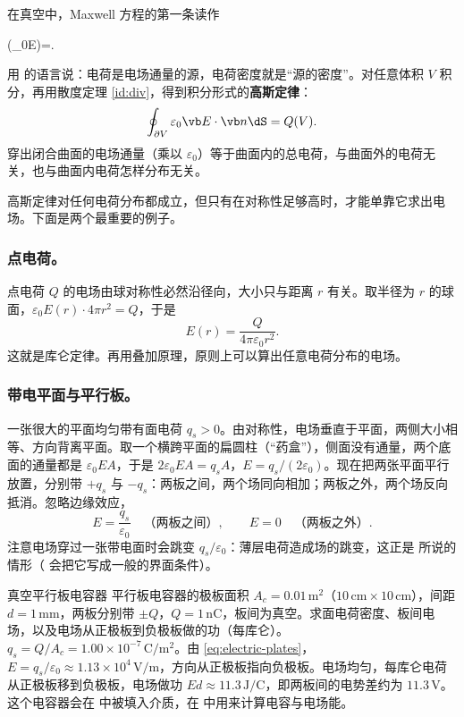 在真空中，Maxwell 方程的第一条读作
\begin{keyeq}
\nabla\cdot(\varepsilon_0\vb E)=\rho .
\label{eq:gaussvac}
\end{keyeq}
用 的语言说：电荷是电场通量的源，电荷密度就是“源的密度”。对任意体积 $V$ 积分，再用散度定理 \eqref{id:div}，得到积分形式的\textbf{高斯定律}：
\begin{equation}
\oint_{\partial V}\varepsilon_0\vb E\cdot\vb n\dS=Q(V).
\label{eq:electric-gaussint}
\end{equation}
穿出闭合曲面的电场通量（乘以 $\varepsilon_0$）等于曲面内的总电荷，与曲面外的电荷无关，也与曲面内电荷怎样分布无关。

高斯定律对任何电荷分布都成立，但只有在对称性足够高时，才能单靠它求出电场。下面是两个最重要的例子。

\subsubsection{点电荷。}
点电荷 $Q$ 的电场由球对称性必然沿径向，大小只与距离 $r$ 有关。取半径为 $r$ 的球面，$\varepsilon_0E(r)\cdot4\pi r^2=Q$，于是
\begin{equation}
E(r)=\frac{Q}{4\pi\varepsilon_0r^2}.
\label{eq:electric-coulomb}
\end{equation}
这就是库仑定律。再用叠加原理，原则上可以算出任意电荷分布的电场。

\subsubsection{带电平面与平行板。}
一张很大的平面均匀带有面电荷 $q_s>0$。由对称性，电场垂直于平面，两侧大小相等、方向背离平面。取一个横跨平面的扁圆柱（“药盒”），侧面没有通量，两个底面的通量都是 $\varepsilon_0EA$，于是 $2\varepsilon_0EA=q_sA$，$E=q_s/(2\varepsilon_0)$。现在把两张平面平行放置，分别带 $+q_s$ 与 $-q_s$：两板之间，两个场同向相加；两板之外，两个场反向抵消。忽略边缘效应，
\begin{equation}
E=\frac{q_s}{\varepsilon_0}\quad\text{（两板之间）},\qquad E=0\quad\text{（两板之外）}.
\label{eq:electric-plates}
\end{equation}
注意电场穿过一张带电面时会跳变 $q_s/\varepsilon_0$：薄层电荷造成场的跳变，这正是 所说的情形（ 会把它写成一般的界面条件）。

\begin{example}{真空平行板电容器}\label{ex:electric-cap}
平行板电容器的极板面积 $A_c=0.01\,\mathrm{m^2}$（$10\,\mathrm{cm}\times10\,\mathrm{cm}$），间距 $d=1\,\mathrm{mm}$，两板分别带 $\pm Q$，$Q=1\,\mathrm{nC}$，板间为真空。求面电荷密度、板间电场，以及电场从正极板到负极板做的功（每库仑）。
\solution
$q_s=Q/A_c=1.00\times10^{-7}\,\mathrm{C/m^2}$。由 \eqref{eq:electric-plates}，$E=q_s/\varepsilon_0\approx1.13\times10^4\,\mathrm{V/m}$，方向从正极板指向负极板。电场均匀，每库仑电荷从正极板移到负极板，电场做功 $Ed\approx11.3\,\mathrm{J/C}$，即两板间的电势差约为 $11.3\,\mathrm V$。这个电容器会在 中被填入介质，在 中用来计算电容与电场能。
\end{example}

